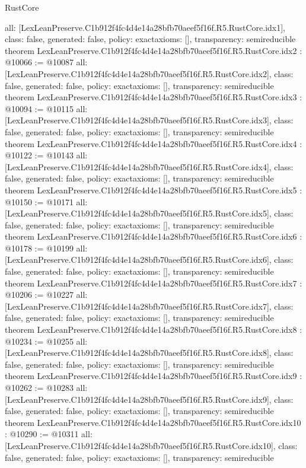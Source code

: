 \begin{lexlean}{RustCore}
\begin{coremodule}
{  all: [LexLeanPreserve.C1b912f4fc4d4e14a28bfb70aeef5f16f.R5.RustCore.idx1],
  class: false,
  generated: false,
  policy: exact{axioms: []},
  transparency: semireducible
}
theorem LexLeanPreserve.C1b912f4fc4d4e14a28bfb70aeef5f16f.R5.RustCore.idx2 : @10066 := @10087 {
  all: [LexLeanPreserve.C1b912f4fc4d4e14a28bfb70aeef5f16f.R5.RustCore.idx2],
  class: false,
  generated: false,
  policy: exact{axioms: []},
  transparency: semireducible
}
theorem LexLeanPreserve.C1b912f4fc4d4e14a28bfb70aeef5f16f.R5.RustCore.idx3 : @10094 := @10115 {
  all: [LexLeanPreserve.C1b912f4fc4d4e14a28bfb70aeef5f16f.R5.RustCore.idx3],
  class: false,
  generated: false,
  policy: exact{axioms: []},
  transparency: semireducible
}
theorem LexLeanPreserve.C1b912f4fc4d4e14a28bfb70aeef5f16f.R5.RustCore.idx4 : @10122 := @10143 {
  all: [LexLeanPreserve.C1b912f4fc4d4e14a28bfb70aeef5f16f.R5.RustCore.idx4],
  class: false,
  generated: false,
  policy: exact{axioms: []},
  transparency: semireducible
}
theorem LexLeanPreserve.C1b912f4fc4d4e14a28bfb70aeef5f16f.R5.RustCore.idx5 : @10150 := @10171 {
  all: [LexLeanPreserve.C1b912f4fc4d4e14a28bfb70aeef5f16f.R5.RustCore.idx5],
  class: false,
  generated: false,
  policy: exact{axioms: []},
  transparency: semireducible
}
theorem LexLeanPreserve.C1b912f4fc4d4e14a28bfb70aeef5f16f.R5.RustCore.idx6 : @10178 := @10199 {
  all: [LexLeanPreserve.C1b912f4fc4d4e14a28bfb70aeef5f16f.R5.RustCore.idx6],
  class: false,
  generated: false,
  policy: exact{axioms: []},
  transparency: semireducible
}
theorem LexLeanPreserve.C1b912f4fc4d4e14a28bfb70aeef5f16f.R5.RustCore.idx7 : @10206 := @10227 {
  all: [LexLeanPreserve.C1b912f4fc4d4e14a28bfb70aeef5f16f.R5.RustCore.idx7],
  class: false,
  generated: false,
  policy: exact{axioms: []},
  transparency: semireducible
}
theorem LexLeanPreserve.C1b912f4fc4d4e14a28bfb70aeef5f16f.R5.RustCore.idx8 : @10234 := @10255 {
  all: [LexLeanPreserve.C1b912f4fc4d4e14a28bfb70aeef5f16f.R5.RustCore.idx8],
  class: false,
  generated: false,
  policy: exact{axioms: []},
  transparency: semireducible
}
theorem LexLeanPreserve.C1b912f4fc4d4e14a28bfb70aeef5f16f.R5.RustCore.idx9 : @10262 := @10283 {
  all: [LexLeanPreserve.C1b912f4fc4d4e14a28bfb70aeef5f16f.R5.RustCore.idx9],
  class: false,
  generated: false,
  policy: exact{axioms: []},
  transparency: semireducible
}
theorem LexLeanPreserve.C1b912f4fc4d4e14a28bfb70aeef5f16f.R5.RustCore.idx10 : @10290 := @10311 {
  all: [LexLeanPreserve.C1b912f4fc4d4e14a28bfb70aeef5f16f.R5.RustCore.idx10],
  class: false,
  generated: false,
  policy: exact{axioms: []},
  transparency: semireducible
}
\end{coremodule}
\end{lexlean}
